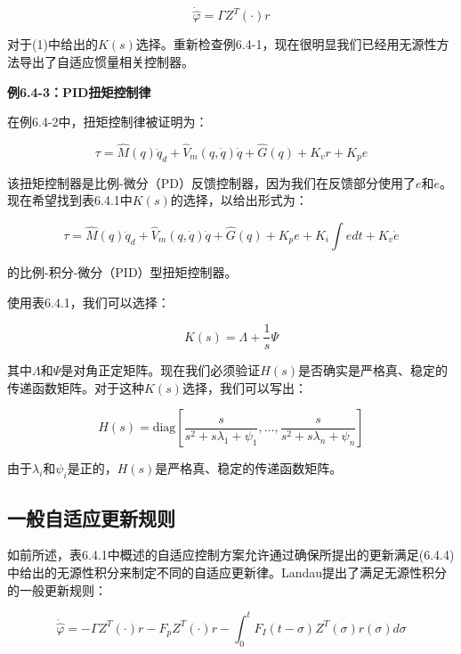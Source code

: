 \documentclass[12pt,a4paper]{ctexart}
\begin{document}
\begin{equation}
\dot{\hat{\varphi}} = \Gamma Z^T(\cdot)r
\end{equation}

对于(1)中给出的$K(s)$选择。重新检查例6.4-1，现在很明显我们已经用无源性方法导出了自适应惯量相关控制器。

\textbf{例6.4-3：PID扭矩控制律}

在例6.4-2中，扭矩控制律被证明为：

\begin{equation}
\tau = \hat{M}(q)\ddot{q}_d + \hat{V}_m(q, \dot{q})\dot{q} + \hat{G}(q) + K_v r + K_p e
\end{equation}

该扭矩控制器是比例-微分（PD）反馈控制器，因为我们在反馈部分使用了$e$和$\dot{e}$。现在希望找到表6.4.1中$K(s)$的选择，以给出形式为：

\begin{equation}
\tau = \hat{M}(q)\ddot{q}_d + \hat{V}_m(q, \dot{q})\dot{q} + \hat{G}(q) + K_p e + K_i \int e dt + K_v \dot{e}
\end{equation}

的比例-积分-微分（PID）型扭矩控制器。

使用表6.4.1，我们可以选择：

\begin{equation}
K(s) = \Lambda + \frac{1}{s}\Psi
\end{equation}

其中$\Lambda$和$\Psi$是对角正定矩阵。现在我们必须验证$H(s)$是否确实是严格真、稳定的传递函数矩阵。对于这种$K(s)$选择，我们可以写出：

\begin{equation}
H(s) = \text{diag}\left[\frac{s}{s^2 + s\lambda_1 + \psi_1}, \ldots, \frac{s}{s^2 + s\lambda_n + \psi_n}\right]
\end{equation}

由于$\lambda_i$和$\psi_i$是正的，$H(s)$是严格真、稳定的传递函数矩阵。

\subsection*{一般自适应更新规则}

如前所述，表6.4.1中概述的自适应控制方案允许通过确保所提出的更新满足(6.4.4)中给出的无源性积分来制定不同的自适应更新律。Landau提出了满足无源性积分的一般更新规则：

\begin{equation}\label{eq:general-update}
\dot{\hat{\varphi}} = -\Gamma Z^T(\cdot)r - F_p Z^T(\cdot)r - \int_0^t F_I(t-\sigma)Z^T(\sigma)r(\sigma)d\sigma
\end{equation}
\end{document}
